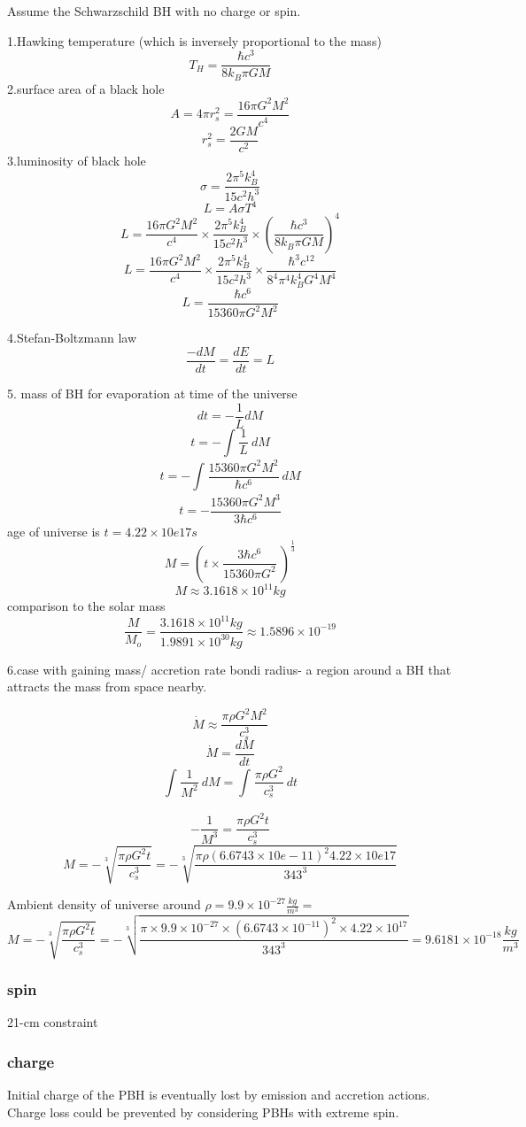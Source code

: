 \documentclass{article}
\begin{document}
Assume the Schwarzschild BH with no charge or spin. 

1.Hawking temperature (which is inversely proportional to the mass) 
\[T_H=\frac{\hbar c^3}{8k_B\pi GM}\]
2.surface area of a black hole
\[A=4\pi r_s^2=\frac{16\pi G^2 M^2}{c^4}\]
\[r_s^2=\frac{2GM}{c^2}\]
3.luminosity of black hole
\[\sigma=\frac{2\pi^5 k_B^4}{15c^2h^3}\]
\[L=A\sigma T^4 \]
\[L=\frac{16\pi G^2 M^2}{c^4} \times \frac{2\pi^5 k_B^4}{15c^2h^3} \times (\frac{\hbar c^3}{8k_B\pi GM})^4\]
\[L=\frac{16\pi G^2 M^2}{c^4} \times \frac{2\pi^5 k_B^4}{15c^2h^3} \times \frac{\hbar^3 c^{12}}{8^4 \pi^4 k_B^4 G^4 M^4}\]
\[L=\frac{\hbar c^6}{15360\pi G^2 M^2}\]

4.Stefan-Boltzmann law
\[\frac{-dM}{dt}=\frac{dE}{dt}=L\]

5. mass of BH for evaporation at time of the universe
\[dt=-\frac{1}{L} dM\]
\[t=-\int_{}^{} \frac{1}{L} \ dM\]
\[t=-\int_{}^{} \frac{15360\pi G^2 M^2}{\hbar c^6} \ dM\]
\[t=- \frac{15360\pi G^2 M^3}{3 \hbar c^6}\]
age of universe is \(t=4.22 \times 10e17s\) 
\[M=(t \times  \frac{3 \hbar c^6}{15360\pi G^2 }\ )^\frac{1}{3}\]
\[M \approx 3.1618 \times 10^{11} kg\]
comparison to the solar mass
\[\frac{M}{M_o}=\frac{3.1618 \times 10^{11} kg}{1.9891 \times 10^{30} kg} \approx 1.5896 \times 10^{-19}\]

6.case with gaining mass/ accretion rate
bondi radius- a region around a BH that attracts the mass from space nearby. 

\[\dot M \approx \frac{\pi \rho G^2 M^2}{c_s^3}\]
\[\dot M=\frac{dM}{dt}\]
\[\int_{}^{} \frac{1}{M^2}\ dM=\int_{}^{} \frac{\pi \rho G^2}{c_s^3}\ dt\]

\[-\frac{1}{M^3}=\frac{\pi \rho G^2 t}{c_s^3} \]
\[M=-\sqrt[3]{\frac{\pi \rho G^2 t}{c_s^3}}=-\sqrt[3]{\frac{\pi \rho (6.6743 \times 10e-11 )^2 4.22 \times 10e17}{343^3}}\]

Ambient density of universe around \(\rho=9.9 \times 10^{-27} \frac{kg}{m^3}=\)
\[M=-\sqrt[3]{\frac{\pi \rho G^2 t}{c_s^3}}=-\sqrt[3]{\frac{\pi \times 9.9 \times 10^{-27} \times  (6.6743 \times 10^{-11} )^2 \times 4.22 \times 10^{17}}{343^3}}=9.6181 \times 10^{-18}  \frac{kg}{m^3}\]





\subsubsection {spin}
21-cm constraint 

\subsubsection {charge}
Initial charge of the PBH is eventually lost by emission and accretion actions. Charge loss could be prevented by considering PBHs with extreme spin. 
\end{document}
